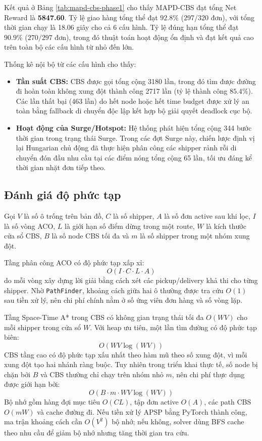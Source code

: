 \documentclass[conference]{IEEEtran}
\begin{document}
Kết quả ở Bảng \ref{tab:mapd-cbs-phase1} cho thấy MAPD-CBS đạt tổng Net Reward là \textbf{5847.60}. Tỷ lệ giao hàng tổng thể đạt $92.8\%$ (297/320 đơn), với tổng thời gian chạy là 18.06 giây cho cả 6 cấu hình. Tỷ lệ đúng hạn tổng thể đạt $90.9\%$ ($270/297$ đơn), trong đó thuật toán hoạt động ổn định và đạt kết quả cao trên toàn bộ các cấu hình từ nhỏ đến lớn.

Thống kê nội bộ từ các cấu hình cho thấy:
\begin{itemize}
    \item \textbf{Tần suất CBS:} CBS được gọi tổng cộng 3180 lần, trong đó tìm được đường đi hoàn toàn không xung đột thành công 2717 lần (tỷ lệ thành công $85.4\%$). Các lần thất bại (463 lần) do hết node hoặc hết time budget được xử lý an toàn bằng fallback di chuyển độc lập kết hợp bộ giải quyết deadlock cục bộ.
    \item \textbf{Hoạt động của Surge/Hotspot:} Hệ thống phát hiện tổng cộng 344 bước thời gian trong trạng thái Surge. Trong các đợt Surge này, chiến lược định vị lại Hungarian chủ động đã thực hiện phân công các shipper rảnh rỗi di chuyển đón đầu nhu cầu tại các điểm nóng tổng cộng 65 lần, tối ưu đáng kể thời gian nhặt đơn tiếp theo.
\end{itemize}

\subsection{Đánh giá độ phức tạp}
Gọi $V$ là số ô trống trên bản đồ, $C$ là số shipper, $A$ là số đơn active sau khi lọc, $I$ là số vòng ACO, $L$ là giới hạn số điểm dừng trong một route, $W$ là kích thước cửa sổ CBS, $B$ là số node CBS tối đa và $m$ là số shipper trong một nhóm xung đột.

Tầng phân công ACO có độ phức tạp xấp xỉ:
\begin{equation}
O(I \cdot C \cdot L \cdot A)
\end{equation}
do mỗi vòng xây dựng lời giải bằng cách xét các pickup/delivery khả thi cho từng shipper. Nhờ \texttt{PathFinder}, khoảng cách giữa hai ô thường được tra cứu $O(1)$ sau tiền xử lý, nên chi phí chính nằm ở số ứng viên đơn hàng và số vòng lặp.

Tầng Space-Time A* trong CBS có không gian trạng thái tối đa $O(WV)$ cho mỗi shipper trong cửa sổ $W$. Với heap ưu tiên, một lần tìm đường có độ phức tạp biên:
\begin{equation}
O(WV \log(WV))
\end{equation}
CBS tầng cao có độ phức tạp xấu nhất theo hàm mũ theo số xung đột, vì mỗi xung đột tạo hai nhánh ràng buộc. Tuy nhiên trong triển khai thực tế, số node bị chặn bởi $B$ và CBS thường chỉ chạy trên nhóm nhỏ $m$, nên chi phí thực dụng được giới hạn bởi:
\begin{equation}
O(B \cdot m \cdot WV \log(WV))
\end{equation}
Bộ nhớ gồm hàng đợi mục tiêu $O(CL)$, tập đơn active $O(A)$, các path CBS $O(mW)$ và cache đường đi. Nếu tiền xử lý APSP bằng PyTorch thành công, ma trận khoảng cách cần $O(V^2)$ bộ nhớ; nếu không, solver dùng BFS cache theo nhu cầu để giảm bộ nhớ nhưng tăng thời gian tra cứu.
\end{document}
